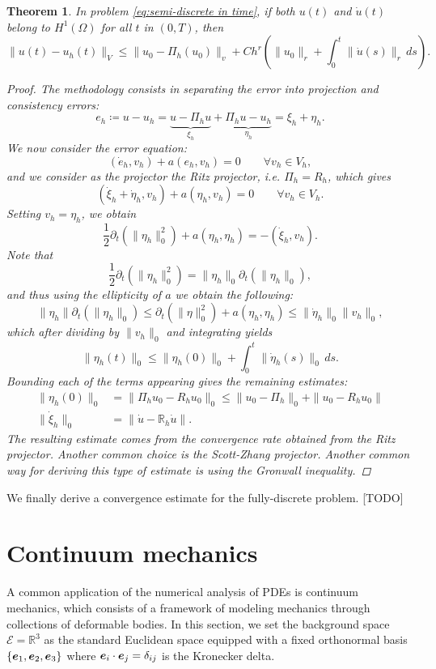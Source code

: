 \documentclass{article}
\renewcommand{\vec}{\vectorsym}
\newcommand{\R}{\mathbb{R}}
\newtheorem{theorem}{Theorem}
\begin{document}
\begin{theorem}
In problem \eqref{eq:semi-discrete in time}, if both $u(t)$ and $\dot u(t)$ belong to $H^1(\Omega)$ for all $t$ in $(0,T)$, then 
    $$ \| u(t) - u_h(t) \|_V \leq \|u_0 - \Pi_h(u_0)\|_v + Ch^r\left(\|u_0\|_r+\int_0^t\|\dot u(s)\|_r\,ds\right). $$
\begin{proof}
The methodology consists in separating the error into \emph{projection} and \emph{consistency} errors: 
    $$ e_h \coloneqq u - u_h = \underbrace{u - \Pi_h u}_{\xi_h} + \underbrace{\Pi_h u - u_h}_{\eta_h} = \xi_h + \eta_h. $$
We now consider the error equation: 
    $$ (\dot e_h, v_h) + a(e_h, v_h) = 0 \qquad \forall v_h\in V_h, $$
and we consider as the projector the Ritz projector, i.e. $\Pi_h=R_h$, which gives
    $$ (\dot \xi_h + \dot \eta_h, v_h) + a(\eta_h, v_h) = 0 \qquad \forall v_h\in V_h. $$
Setting $v_h = \eta_h$, we obtain 
    $$ \frac 1 2 \partial_t(\|\eta_h\|^2_0)+a(\eta_h,\eta_h) = -(\dot \xi_h, v_h). $$
Note that 
    $$ \frac 1 2 \partial_t(\|\eta_h\|_0^2) = \|\eta_h\|_0 \partial_t(\|\eta_h\|_0), $$
and thus using the ellipticity of $a$ we obtain the following: 
    $$ \|\eta_h\|\partial_t(\|\eta_h\|_0) \leq \partial_t(\|\eta\|_0^2) + a(\eta_h, \eta_h) \leq \|\dot \eta_h\|_0 \|v_h\|_0, $$
which after dividing by $\|v_h\|_0$ and integrating yields
    $$ \| \eta_h(t)\|_0 \leq \|\eta_h(0)\|_0 + \int_0^t \| \dot \eta_h(s) \|_0\,ds. $$
Bounding each of the terms appearing gives the remaining estimates: 
    \begin{align*}
        \| \eta_h(0) \|_0 &= \|\Pi_h u_0 - R_h u_0 \|_0 \leq \|u_0 - \Pi_h\|_0 + \| u_0 - R_h u_0\|\\ 
        \| \dot \xi_h \|_0 &= \| \dot u - \R_h \dot u \|.
    \end{align*}
The resulting estimate comes from the convergence rate obtained from the Ritz projector. Another common choice is the Scott-Zhang projector. Another common way for deriving this type of estimate is using the Gronwall inequality.
\end{proof}
\end{theorem}
We finally derive a convergence estimate for the fully-discrete problem. [TODO]

\section{Continuum mechanics}\label{sec:continuum}
A common application of the numerical analysis of PDEs is continuum mechanics, which consists of a framework of modeling mechanics through collections of deformable bodies. In this section, we set the background space $\mathcal{E} = \R^3$ as the standard Euclidean space equipped with a fixed orthonormal basis $\{\vec e_1, \vec e_2, \vec e_3\}$ where $\vec e_i\cdot\vec e_j = \delta_{ij}$ is the Kronecker delta.
\end{document}
